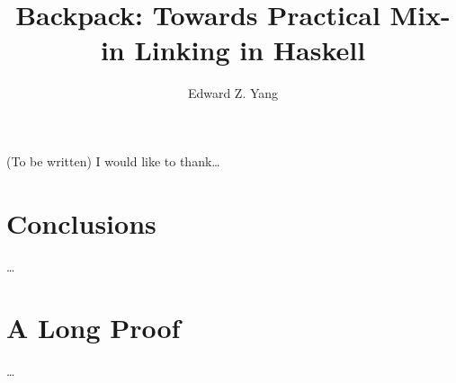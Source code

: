 \documentclass{report}
\begin{document}
\title{Backpack: Towards Practical Mix-in Linking in Haskell}
\author{Edward Z. Yang}

\beforepreface%
    (To be written)
    I would like to thank\ldots
\afterpreface%


%









\chapter{Conclusions}
    \ldots
\appendix
\chapter{A Long Proof}
     \ldots


\end{document}
